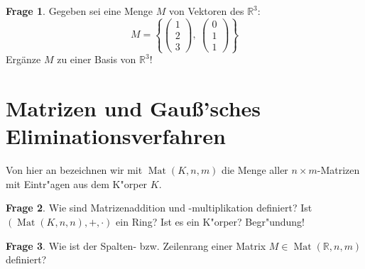 \documentclass{scrartcl}
\theoremstyle{definition}
\newtheorem{frage}{Frage}
\newcommand{\R}{\mathbb R}
\DeclareMathOperator{\Mat}{Mat}
\begin{document}
\begin{frage}
Gegeben sei eine Menge $M$ von Vektoren des $\R^3$:
\[
    M = \left\{ 
        \begin{pmatrix} 1 \\ 2 \\ 3 \end{pmatrix}, \:
        \begin{pmatrix} 0 \\ 1 \\ 1 \end{pmatrix}
    \right\}
\]
Ergänze $M$ zu einer Basis von $\R^3$!
\end{frage}

\section {Matrizen und Gauß'sches Eliminationsverfahren}

Von hier an bezeichnen wir mit $\Mat(K, n, m)$ die Menge aller
$n \times m$-Matrizen mit Eintr"agen aus dem K"orper $K$.

\begin{frage}
Wie sind Matrizenaddition und -multiplikation definiert? Ist
$(\Mat(K, n, n), +, \cdot)$ ein Ring? Ist es ein K"orper? Begr"undung!
\end{frage}

\begin{frage}
Wie ist der Spalten- bzw. Zeilenrang einer Matrix $M \in \Mat(\R, n, m)$
definiert?
\end{frage}
\end{document}
